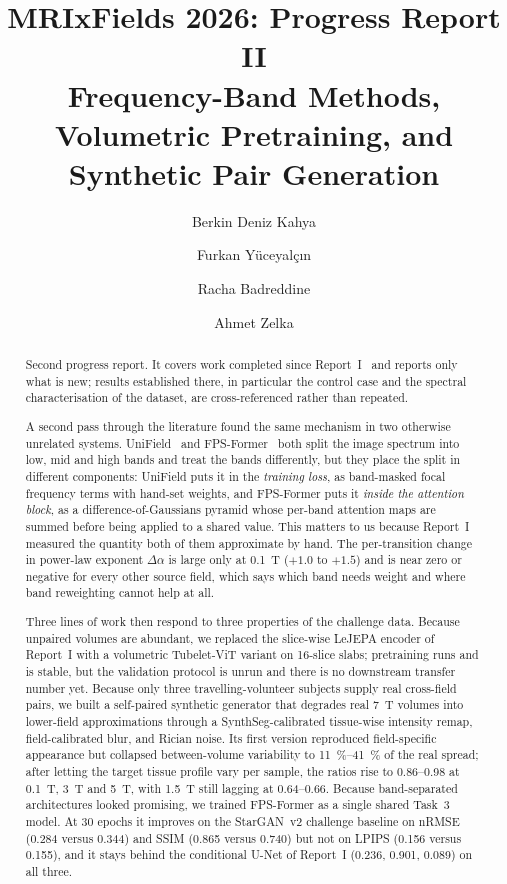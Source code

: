 \documentclass[11pt,a4paper]{article}
\title{\bfseries MRIxFields 2026: Progress Report II\\[0.3em]
\large Frequency-Band Methods, Volumetric Pretraining, and Synthetic Pair Generation}
\author{Berkin Deniz Kahya \and Furkan Yüceyalçın \and Racha Badreddine \and Ahmet Zelka}
\date{}
\newcommand{\rmse}{nRMSE}
\newcommand{\reportone}{Report~I}
\begin{document}
\maketitle

\begin{abstract}
\noindent
Second progress report. It covers work completed since \reportone{}~\cite{report1} and reports only what
is new; results established there, in particular the control case and the spectral characterisation
of the dataset, are cross-referenced rather than repeated.

A second pass through the literature found the same mechanism in two otherwise unrelated systems.
UniField~\cite{lin2026unifield} and FPS-Former~\cite{meng2025fpsformer} both split the image spectrum
into low, mid and high bands and treat the bands differently, but they place the split in different
components: UniField puts it in the \emph{training loss}, as band-masked focal frequency terms with
hand-set weights, and FPS-Former puts it \emph{inside the attention block}, as a difference-of-Gaussians
pyramid whose per-band attention maps are summed before being applied to a shared value. This matters to
us because \reportone{} measured the quantity both of them approximate by hand. The per-transition change
in power-law exponent $\Delta\alpha$ is large only at \SI{0.1}{\tesla} ($+1.0$ to $+1.5$) and is near
zero or negative for every other source field, which says which band needs weight and where band
reweighting cannot help at all.

Three lines of work then respond to three properties of the challenge data. Because unpaired volumes are
abundant, we replaced the slice-wise LeJEPA encoder of \reportone{} with a volumetric Tubelet-ViT variant
on 16-slice slabs; pretraining runs and is stable, but the validation protocol is unrun and there is no
downstream transfer number yet. Because only three travelling-volunteer subjects supply real cross-field
pairs, we built a self-paired synthetic generator that degrades real \SI{7}{\tesla} volumes into
lower-field approximations through a SynthSeg-calibrated tissue-wise intensity remap, field-calibrated
blur, and Rician noise. Its first version reproduced field-specific appearance but collapsed
between-volume variability to \SIrange{11}{41}{\percent} of the real spread; after letting the target
tissue profile vary per sample, the ratios rise to \numrange{0.86}{0.98} at \SI{0.1}{\tesla},
\SI{3}{\tesla} and \SI{5}{\tesla}, with \SI{1.5}{\tesla} still lagging at \numrange{0.64}{0.66}. Because
band-separated architectures looked promising, we trained FPS-Former as a single shared Task~3 model.
At 30 epochs it improves on the StarGAN~v2 challenge baseline on \rmse{} (\num{0.284} versus
\num{0.344}) and SSIM (\num{0.865} versus \num{0.740}) but not on LPIPS (\num{0.156} versus
\num{0.155}), and it stays behind the conditional U-Net of \reportone{} (\num{0.236}, \num{0.901},
\num{0.089}) on all three.


\end{abstract}
\end{document}
